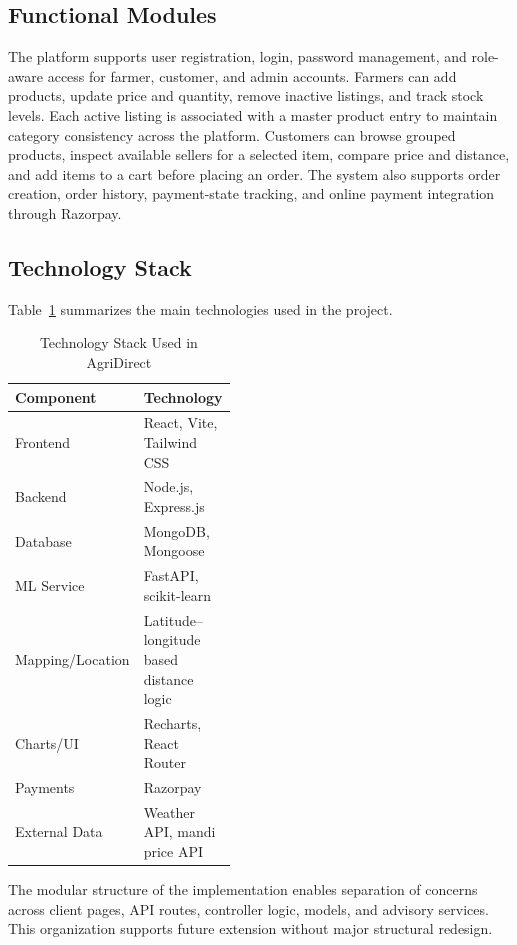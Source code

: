 \documentclass[conference]{IEEEtran}
\begin{document}
\subsection{Functional Modules}
The platform supports user registration, login, password management, and role-aware access for farmer, customer, and admin accounts. Farmers can add products, update price and quantity, remove inactive listings, and track stock levels. Each active listing is associated with a master product entry to maintain category consistency across the platform. Customers can browse grouped products, inspect available sellers for a selected item, compare price and distance, and add items to a cart before placing an order. The system also supports order creation, order history, payment-state tracking, and online payment integration through Razorpay.

\subsection{Technology Stack}
Table~\ref{tab:stack} summarizes the main technologies used in the project.

\begin{table}[htbp]
\caption{Technology Stack Used in AgriDirect}
\label{tab:stack}
\centering
\begin{tabular}{>{\raggedright\arraybackslash}p{0.22\linewidth} >{\raggedright\arraybackslash}p{0.22\linewidth}}
\toprule
\textbf{Component} & \textbf{Technology} \\
\midrule
Frontend & React, Vite, Tailwind CSS \\
Backend & Node.js, Express.js \\
Database & MongoDB, Mongoose \\
ML Service & FastAPI, scikit-learn \\
Mapping/Location & Latitude--longitude based distance logic \\
Charts/UI & Recharts, React Router \\
Payments & Razorpay \\
External Data & Weather API, mandi price API \\
\bottomrule
\end{tabular}
\end{table}

The modular structure of the implementation enables separation of concerns across client pages, API routes, controller logic, models, and advisory services. This organization supports future extension without major structural redesign.
\end{document}
